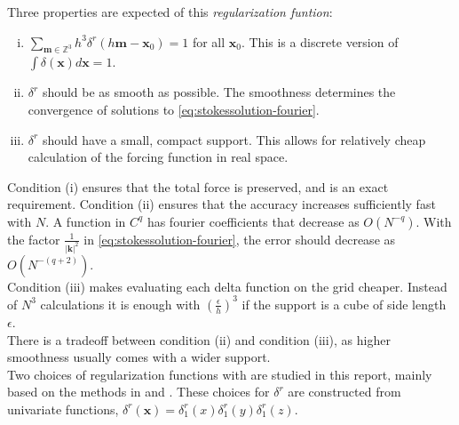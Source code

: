 \documentclass[a4paper,
twoside=false,abstract=false,numbers=noenddot,
titlepage=false,headings=small,parskip=half,version=last]{scrartcl}
\begin{document}
Three properties are expected of this \emph{regularization funtion}:
\begin{enumerate}[(i)]
\item $\sum_{\mathbf{m}\in \mathbb{Z}^3}h^3\delta^{r}(h\mathbf{m}-\mathbf{x}_0) = 1$ for all $\mathbf{x}_0$. This is a discrete version of $\int \delta(\mathbf{x}) d\mathbf{x}=1$.
\item $\delta^{r}$ should be as smooth as possible. The smoothness determines the convergence of solutions to \eqref{eq:stokessolution-fourier}.
\item $\delta^{r}$ should have a small, compact support. This allows for relatively cheap calculation of the forcing function in real space.
\end{enumerate}
Condition (i) ensures that the total force is preserved, and is an exact requirement.
Condition (ii) ensures that the accuracy increases sufficiently fast with $N$.
A function in $C^q$ has fourier coefficients that decrease as $O(N^{-q})$.
With the factor $\frac{1}{|\mathbf{k}|^2}$ in \eqref{eq:stokessolution-fourier}, the error should decrease as $O(N^{-(q+2)})$.\\
Condition (iii) makes evaluating each delta function on the grid cheaper. Instead of $N^3$ calculations it is enough with $\left(\frac{\epsilon}{h}\right)^3$ if the support is a cube of side length $\epsilon$.\\
There is a tradeoff between condition (ii) and condition (iii), as higher smoothness usually comes with a wider support.\\
Two choices of regularization functions with are studied in this report, mainly based on the methods in \cite{spectralewald} and \cite{interfaceregularization}.
These choices for $\delta^{r}$ are constructed from univariate functions, $\delta^{r}(\mathbf{x}) = \delta^{r}_{1}(x) \delta^{r}_{1}(y) \delta^{r}_{1}(z)$.

\end{document}
